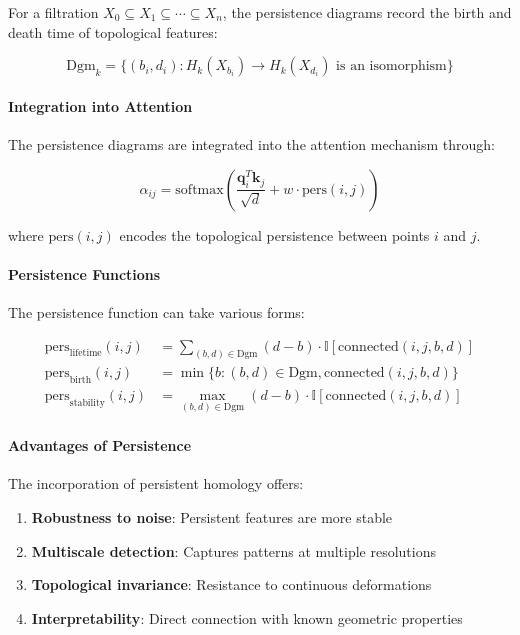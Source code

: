For a filtration $X_0 \subseteq X_1 \subseteq \cdots \subseteq X_n$, the persistence diagrams record the birth and death time of topological features:

\begin{equation}
\text{Dgm}_k = \{(b_i, d_i) : H_k(X_{b_i}) \to H_k(X_{d_i}) \text{ is an isomorphism}\}
\label{eq:persistence_diagram}
\end{equation}

\paragraph{Integration into Attention}

The persistence diagrams are integrated into the attention mechanism through:

\begin{equation}
\alpha_{ij} = \text{softmax}\left(\frac{\mathbf{q}_i^T \mathbf{k}_j}{\sqrt{d}} + w \cdot \text{pers}(i,j)\right)
\label{eq:persistent_attention_weights}
\end{equation}

where $\text{pers}(i,j)$ encodes the topological persistence between points $i$ and $j$.

\paragraph{Persistence Functions}

The persistence function can take various forms:

\begin{align}
\text{pers}_{\text{lifetime}}(i,j) &= \sum_{(b,d) \in \text{Dgm}} (d-b) \cdot \mathbb{I}[\text{connected}(i,j,b,d)] \label{eq:lifetime_persistence} \\
\text{pers}_{\text{birth}}(i,j) &= \min\{b : (b,d) \in \text{Dgm}, \text{connected}(i,j,b,d)\} \\
\text{pers}_{\text{stability}}(i,j) &= \max_{(b,d) \in \text{Dgm}} (d-b) \cdot \mathbb{I}[\text{connected}(i,j,b,d)]
\end{align}

\paragraph{Advantages of Persistence}

The incorporation of persistent homology offers:

\begin{enumerate}
    \item \textbf{Robustness to noise}: Persistent features are more stable
    \item \textbf{Multiscale detection}: Captures patterns at multiple resolutions
    \item \textbf{Topological invariance}: Resistance to continuous deformations
    \item \textbf{Interpretability}: Direct connection with known geometric properties
\end{enumerate}


